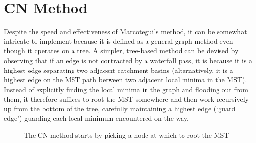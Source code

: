 \documentclass[review,a4paper]{elsarticle}
\newenvironment{stusubfig}[1]
{
	\begin{figure}[#1]
	\begin{center}
}
{
	\end{center}
	\end{figure}
}
\begin{document}
\section{CN Method}
\label{sec:nicholls}

Despite the speed and effectiveness of Marcotegui's method, it can be somewhat intricate to implement \cite{golodetz08} because it is defined as a general graph method even though it operates on a tree. A simpler, tree-based method can be devised by observing that if an edge is not contracted by a waterfall pass, it is because it is a highest edge separating two adjacent catchment basins (alternatively, it is a highest edge on the MST path between two adjacent local minima in the MST). Instead of explicitly finding the local minima in the graph and flooding out from them, it therefore suffices to root the MST somewhere and then work recursively up from the bottom of the tree, carefully maintaining a highest edge (`guard edge') guarding each local minimum encountered on the way.

\begin{stusubfig}{p}
	\hspace{4mm}%
\caption{The CN method starts by picking a node at which to root the MST}%
\label{fig:segmentation-waterfall-nicholls-root}
\end{stusubfig}
\end{document}
